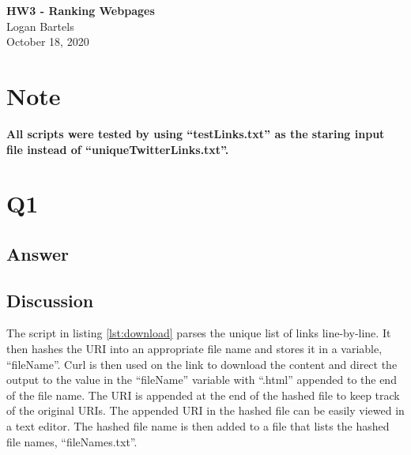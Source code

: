 \documentclass[12pt]{article}
\begin{document}
\begin{centering}
{\large\textbf{HW3 - Ranking Webpages}}\\ %
Logan Bartels\\                     %
October 18, 2020\\                      %
\end{centering}


\section*{Note}
\textbf{All scripts were tested by using ``testLinks.txt'' as the staring input file instead of ``uniqueTwitterLinks.txt''.}

\section*{Q1}

\subsection*{Answer}






\subsection*{Discussion}
The script in listing \ref{lst:download} parses the unique list of links line-by-line.  It then hashes the URI into an appropriate file name and stores it in a variable, ``fileName''.  Curl is then used on the link to download the content and direct the output to the value in the ``fileName'' variable with ``.html'' appended to the end of the file name.  The URI is appended at the end of the hashed file to keep track of the original URIs.  The appended URI in the hashed file can be easily viewed in a text editor.  The hashed file name is then added to a file that lists the hashed file names, ``fileNames.txt''.
\end{document}

